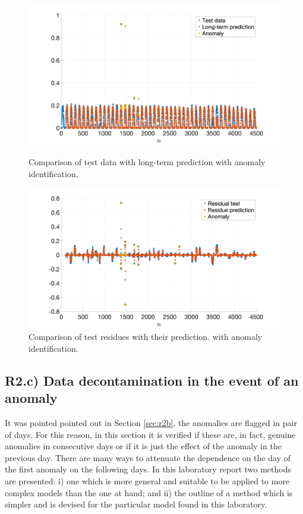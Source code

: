 \documentclass[]{scrartcl}
\begin{document}
\begin{figure}[htbp]
	\centering
	\begin{minipage}[b]{.49\textwidth}
		\centering
		\includegraphics[width= 1.1\textwidth]{figures/R2b_test_an.png}
		\caption{Comparison of test data with long-term prediction with anomaly identification.}
		\label{fig:R2b_test_an}
	\end{minipage}
	\hfill
	\begin{minipage}[b]{.49\textwidth}
		\centering
		\includegraphics[width= 1.1\textwidth]{figures/R2b_residual_an.png}
		\caption{Comparison of test residues with their prediction. with anomaly identification.}
		\label{fig:R2b_residual_an}
	\end{minipage}
\end{figure}

\subsection{R2.c) Data decontamination in the event of an anomaly}
It was pointed pointed out in Section \ref{sec:r2b}, the anomalies are flagged in pair of days. For this reason, in this section it is verified if these are, in fact, genuine anomalies in consecutive days or if it is just the effect of the anomaly in the previous day. There are many ways to attenuate the dependence on the day of the first anomaly on the following days. In this laboratory report two methods are presented: i) one which is more general and suitable to be applied to more complex models than the one at hand; and ii) the outline of a method which is simpler and is devised for the particular model found in this laboratory.
\end{document}
